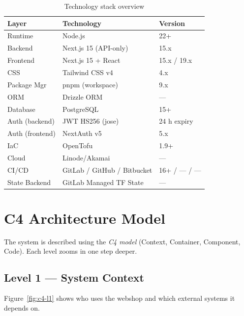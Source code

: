 \documentclass[12pt,a4paper,twoside]{report}
\newcommand{\term}[1]{\textit{#1}}
\begin{document}
\begin{table}[H]
  \centering
  \caption{Technology stack overview}
  \label{tab:stack}
  \begin{tabularx}{\linewidth}{@{}l>{\raggedright\arraybackslash}Xl@{}}
    \toprule
    \textbf{Layer} & \textbf{Technology} & \textbf{Version} \\
    \midrule
    Runtime        & Node.js                  & 22+ \\
    Backend        & Next.js 15 (API-only)    & 15.x \\
    Frontend       & Next.js 15 + React       & 15.x / 19.x \\
    CSS            & Tailwind CSS v4          & 4.x \\
    Package Mgr    & pnpm (workspace)         & 9.x \\
    ORM            & Drizzle ORM              & — \\
    Database       & PostgreSQL               & 15+ \\
    Auth (backend) & JWT HS256 (jose)         & 24 h expiry \\
    Auth (frontend)& NextAuth v5              & 5.x \\
    IaC            & OpenTofu                 & 1.9+ \\
    Cloud          & Linode/Akamai            & — \\
    CI/CD          & GitLab / GitHub / Bitbucket & 16+ / — / — \\
    State Backend  & GitLab Managed TF State  & — \\
    \bottomrule
  \end{tabularx}
\end{table}

\chapter{C4 Architecture Model}
\label{ch:c4}

The system is described using the \term{C4 model} (Context, Container,
Component, Code). Each level zooms in one step deeper.

\section{Level 1 — System Context}
\label{sec:c4-l1}

Figure~\ref{fig:c4-l1} shows who uses the webshop and which external
systems it depends on.
\end{document}
